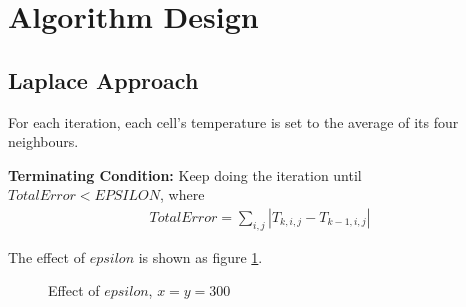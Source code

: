 \documentclass{acm_proc_article-sp}
\begin{document}
\section{Algorithm Design}

\subsection{Laplace Approach}

For each iteration, each cell's temperature is set to the average of its four neighbours. 

\textbf{Terminating Condition:} Keep doing the iteration until $TotalError < EPSILON$, where
\begin{align}
	TotalError = \sum_{i,j} |T_{k,i,j}-T_{k-1,i,j}|
\end{align}

The effect of $epsilon$ is shown as figure \ref{effectofepsilon}.

\begin{figure} 
  \centering 
  \hspace{1cm} 
  \hspace{1cm} 
  \caption{Effect of $epsilon$, $x = y = 300$} 
  \label{effectofepsilon} %
\end{figure}
\end{document}
